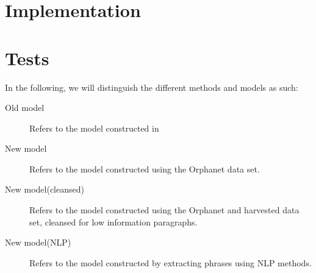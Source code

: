 \documentclass[10pt,letterpaper,final]{article}
\begin{document}




\section{Implementation}
\label{chap:implementation}


\section{Tests}
\label{chap:test}
In the following, we will distinguish the different methods and models
as such:
\begin{description}
\item[Old model] Refers to the model constructed in
\cite{jensenandersen}
\item[New model] Refers to the model constructed using the Orphanet data
set.
\item[New model(cleansed)] Refers to the model constructed using the
Orphanet and harvested data set, cleansed for low information
paragraphs.
\item[New model(NLP)] Refers to the model constructed by extracting
phrases using NLP methods.
\end{description}
\end{document}
